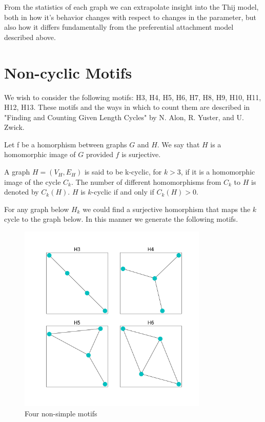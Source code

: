 From the statistics of each graph we can extrapolate insight into the Thij model, both 
in how it's behavior changes with respect to changes in the parameter, but also how
it differs fundamentally from the preferential attachment model described above.


\newpage

\section{Non-cyclic Motifs}

We wish to consider the following motifs: H3, H4, H5, H6, H7, H8, H9, H10, H11, H12, H13.
These motifs and the ways in which to count them are described in "Finding and Counting 
Given Length Cycles" by N. Alon, R. Yuster, and U. Zwick.


\begin{dfn}
    Let f be a homorphism between graphs $G$ and $H$. We say that $H$ is a
    homomorphic image of $G$ provided $f$ is surjective.
\end{dfn}

\begin{dfn}
    A graph $H = (V_H, E_H)$ is said to be k-cyclic, for $k > 3$, if it is a
homomorphic image of the cycle $C_k$. The number of different homomorphisms from $C_k$
to $H$ is denoted by $C_k(H)$.  $H$ is $k$-cyclic if and only if $C_k(H) > 0$.
\end{dfn}
\vspace{3mm}

For any graph below $H_k$ we could find a surjective homorphism that maps the $k$ cycle to the graph below. 
In this manner we generate the following motifs.
\vspace{3mm}

\begin{figure}[h!]
    \includegraphics[width=9cm]{Images/motif_set_one.png}
    \centering
    \caption{Four non-simple motifs}
\end{figure}

